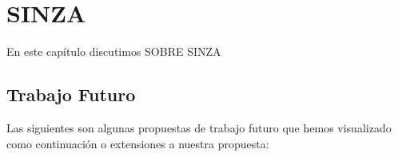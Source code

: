 \chapter{SINZA} \label{cha:conclusions}

En este cap\'itulo discutimos SOBRE SINZA%
\section{Trabajo Futuro} \label{sec:futurework}

Las siguientes son algunas propuestas de trabajo futuro que hemos visualizado como continuaci\'on o extensiones a nuestra propuesta:

